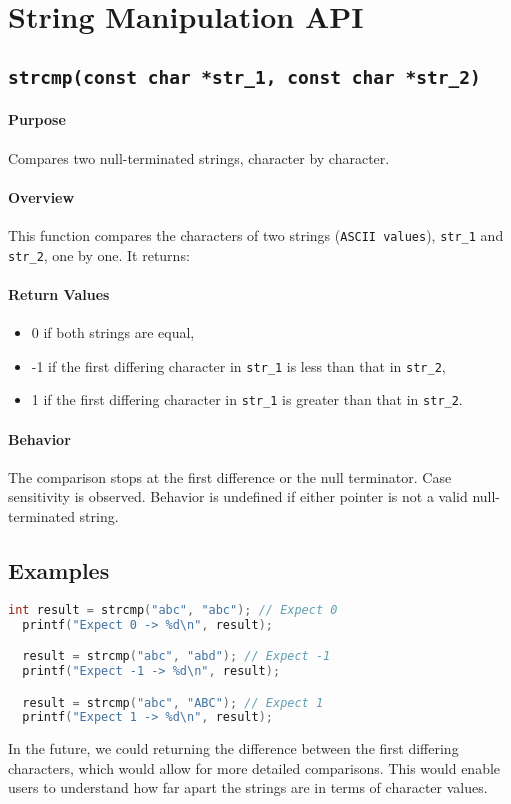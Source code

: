 \newpage
\section{String Manipulation API}
\subsection{\texttt{strcmp(const char *str\_1, const char *str\_2)}}

\paragraph{Purpose}
Compares two null-terminated strings, character by character.

\paragraph{Overview}
This function compares the characters of two strings (\texttt{ASCII values}), 
\texttt{str\_1} and \texttt{str\_2}, one by one. It returns:

\paragraph{Return Values}
\begin{itemize}
    \item 0 if both strings are equal,
    \item -1 if the first differing character in \texttt{str\_1} is less than that in \texttt{str\_2},
    \item 1 if the first differing character in \texttt{str\_1} is greater than that in \texttt{str\_2}.
\end{itemize}

\paragraph{Behavior}
The comparison stops at the first difference or the null terminator. 
Case sensitivity is observed. Behavior is undefined if either pointer is not a 
valid null-terminated string.

\subsection*{Examples}
\begin{lstlisting}[language=C, caption=String Comparison Example]
  int result = strcmp("abc", "abc"); // Expect 0
  printf("Expect 0 -> %d\n", result);

  result = strcmp("abc", "abd"); // Expect -1
  printf("Expect -1 -> %d\n", result);

  result = strcmp("abc", "ABC"); // Expect 1
  printf("Expect 1 -> %d\n", result);
\end{lstlisting}

\begin{note}
In the future, we could returning the difference between the first differing 
characters, which would allow for more detailed comparisons. This would enable 
users to understand how far apart the strings are in terms of character values.
\end{note}